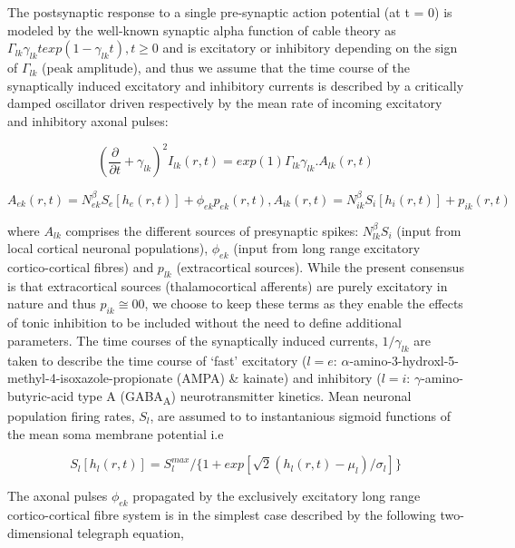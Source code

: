 \documentclass[a4paper,12pt]{article}
\begin{document}
The postsynaptic response to a single pre-synaptic action potential (at
t = 0) is modeled by the well-known synaptic alpha function of cable
theory as $\Gamma_{lk} \gamma_{lk}texp(1-\gamma_{lk}t), t \geq 0$ and is excitatory or inhibitory depending
on the sign of $\Gamma_{lk}$ (peak amplitude), and thus we assume that the time
course of the synaptically induced excitatory and inhibitory currents is
described by a critically damped oscillator driven respectively by the
mean rate of incoming excitatory and inhibitory axonal pulses:

\begin{equation} \label{eq:i_lk}
\left( \frac{\partial}{\partial t} + \gamma_{lk} \right)^2 I_{lk}(r,t) = exp(1)\Gamma_{lk}\gamma_{lk}.A_{lk}(r,t)
\end{equation}

\begin{equation} \label{eq:a_ek}
A_{ek}(r,t) = N_{ek}^{\beta} S_e[ h_e(r,t)] + \phi_{ek} p_{ek}(r,t),  A_{ik}(r,t) = N_{ik}^{\beta} S_i[h_i(r,t)] + p_{ik}(r,t)
\end{equation}

where $A_{lk}$ comprises the different sources of presynaptic spikes: $N_{lk}^\beta S_i$ (input from local cortical neuronal populations), $\phi_{ek}$ (input from long range excitatory cortico-cortical fibres) and $p_{lk}$ (extracortical sources).
While the present consensus is that extracortical sources
(thalamocortical afferents) are purely excitatory in nature and thus $p_{ik} \cong 0$0, we choose to keep these terms as they enable the effects of
tonic inhibition to be included without the need to define additional
parameters. The time courses of the synaptically induced currents, $1 / \gamma_{lk}$ are taken to describe the time course of ‘fast’ excitatory ($l = e$: $\alpha$-amino-3-hydroxl-5-methyl-4-isoxazole-propionate (AMPA) \& kainate) and inhibitory ($l=i$: $\gamma$-amino-butyric-acid type A (GABA\textsubscript{A}) neurotransmitter kinetics. Mean neuronal population firing rates, $S_l$, are assumed to to instantanious sigmoid functions of the mean soma membrane potential i.e

\begin{equation} \label{eq:s_l}
S_l[h_l(r,t)]=S_l^{max}/\{1 + exp[\sqrt{2}(h_l(r,t)-\mu_l)/\sigma_l]\}
\end{equation}

The axonal pulses $\phi_{ek}$ propagated by the exclusively excitatory long
range cortico-cortical fibre system is in the simplest case described by
the following two-dimensional telegraph equation,
\end{document}
